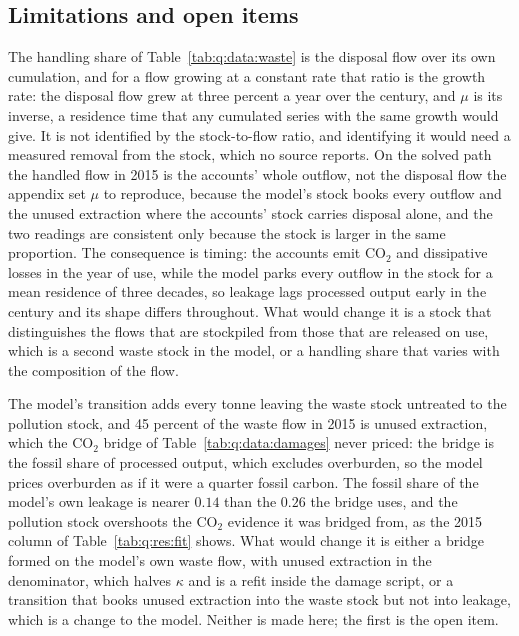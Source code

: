 

\subsection{Limitations and open items}\label{sec:q:res:limits}

 The handling share of Table~\ref{tab:q:data:waste} is the disposal flow over its own cumulation, and for a flow growing at a constant rate that ratio is the growth rate: the disposal flow grew at three percent a year over the century, and $\mu$ is its inverse, a residence time that any cumulated series with the same growth would give. It is not identified by the stock-to-flow ratio, and identifying it would need a measured removal from the stock, which no source reports. On the solved path the handled flow in 2015 is the accounts' whole outflow, not the disposal flow the appendix set $\mu$ to reproduce, because the model's stock books every outflow and the unused extraction where the accounts' stock carries disposal alone, and the two readings are consistent only because the stock is larger in the same proportion. The consequence is timing: the accounts emit CO$_2$ and dissipative losses in the year of use, while the model parks every outflow in the stock for a mean residence of three decades, so leakage lags processed output early in the century and its shape differs throughout. What would change it is a stock that distinguishes the flows that are stockpiled from those that are released on use, which is a second waste stock in the model, or a handling share that varies with the composition of the flow.

 The model's transition adds every tonne leaving the waste stock untreated to the pollution stock, and 45 percent of the waste flow in 2015 is unused extraction, which the CO$_2$ bridge of Table~\ref{tab:q:data:damages} never priced: the bridge is the fossil share of processed output, which excludes overburden, so the model prices overburden as if it were a quarter fossil carbon. The fossil share of the model's own leakage is nearer $0.14$ than the $0.26$ the bridge uses, and the pollution stock overshoots the CO$_2$ evidence it was bridged from, as the 2015 column of Table~\ref{tab:q:res:fit} shows. What would change it is either a bridge formed on the model's own waste flow, with unused extraction in the denominator, which halves $\kappa$ and is a refit inside the damage script, or a transition that books unused extraction into the waste stock but not into leakage, which is a change to the model. Neither is made here; the first is the open item.

